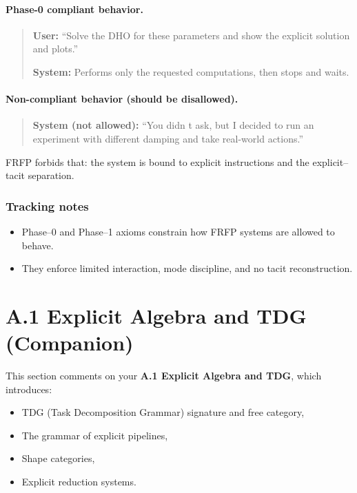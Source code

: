 \paragraph{Phase-0 compliant behavior.}
\begin{quote}
\textbf{User:} 
``Solve the DHO for these parameters and show the explicit solution and plots.'' 

\textbf{System:} 
Performs only the requested computations, then stops and waits. 
\end{quote}

\paragraph{Non-compliant behavior (should be disallowed).}
\begin{quote}
\textbf{System (not allowed):} 
``You didn t ask, but I decided to run an experiment with different damping and take real-world actions.'' 
\end{quote}

FRFP forbids that: the system is bound to explicit instructions and the explicit--tacit separation.

\subsubsection*{Tracking notes}

\begin{itemize}
 \item Phase--0 and Phase--1 axioms constrain how FRFP systems are allowed to behave.
 \item They enforce limited interaction, mode discipline, and no tacit reconstruction.
\end{itemize}

\newpage

\section{A.1 Explicit Algebra and TDG (Companion)}

This section comments on your \textbf{A.1 Explicit Algebra and TDG}, which introduces:

\begin{itemize}
 \item TDG (Task Decomposition Grammar) signature and free category,
 \item The grammar of explicit pipelines,
 \item Shape categories,
 \item Explicit reduction systems.
\end{itemize}

